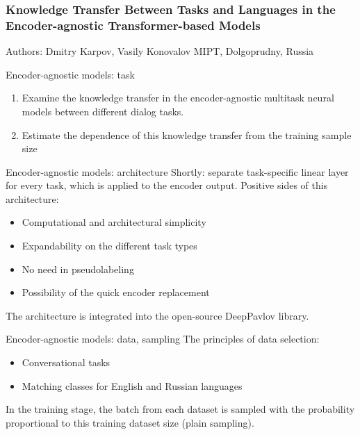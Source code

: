 \begin{frame}
    \setcounter{framenumber}{1}
    \frametitle{Knowledge Transfer Between Tasks and Languages in the Encoder-agnostic Transformer-based Models}
    Authors: Dmitry Karpov, Vasily Konovalov
    MIPT, Dolgoprudny, Russia
    
\end{frame}

\begin{frame}{Encoder-agnostic models: task}
\begin{enumerate}
    \item Examine the knowledge transfer in the encoder-agnostic multitask neural models between different dialog tasks. 
    \item Estimate the dependence of this knowledge transfer from the training sample size
 \end{enumerate}
\end{frame}

\begin{frame}{Encoder-agnostic models: architecture}
Shortly: separate task-specific linear layer for every task, which is applied to the encoder output. 
Positive sides of this architecture:
\begin{itemize}
  \item Computational and architectural simplicity
  \item Expandability on the different task types
  \item No need in pseudolabeling
  \item Possibility of the quick encoder replacement
\end{itemize}
The architecture is integrated into the open-source DeepPavlov library.
\end{frame}

\begin{frame}{Encoder-agnostic models: data, sampling}
The principles of data selection:
\begin{itemize}
    \item Conversational tasks
    \item Matching classes for English and Russian languages
\end{itemize}
In the training stage, the batch from each dataset is sampled with the probability proportional to this training dataset size (plain sampling).
\end{frame}

